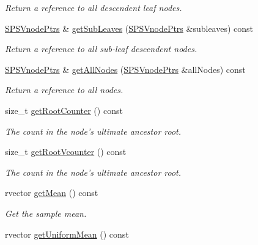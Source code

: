 \begin{DoxyCompactItemize}
\begin{DoxyCompactList}\small\item\em \-Return a reference to all descendent leaf nodes. \end{DoxyCompactList}\item 
\hyperlink{namespacesubpavings_a90b5f0e33fa46403066cc5a89929e6a9}{\-S\-P\-S\-Vnode\-Ptrs} \& \hyperlink{classsubpavings_1_1SPSVnode_aa5408d2d74de8b95325c5973cf43f7fb}{get\-Sub\-Leaves} (\hyperlink{namespacesubpavings_a90b5f0e33fa46403066cc5a89929e6a9}{\-S\-P\-S\-Vnode\-Ptrs} \&subleaves) const 
\begin{DoxyCompactList}\small\item\em \-Return a reference to all sub-\/leaf descendent nodes. \end{DoxyCompactList}\item 
\hyperlink{namespacesubpavings_a90b5f0e33fa46403066cc5a89929e6a9}{\-S\-P\-S\-Vnode\-Ptrs} \& \hyperlink{classsubpavings_1_1SPSVnode_ac637655f207bc9bc049145a2bd904fdf}{get\-All\-Nodes} (\hyperlink{namespacesubpavings_a90b5f0e33fa46403066cc5a89929e6a9}{\-S\-P\-S\-Vnode\-Ptrs} \&all\-Nodes) const 
\begin{DoxyCompactList}\small\item\em \-Return a reference to all nodes. \end{DoxyCompactList}\item 
size\-\_\-t \hyperlink{classsubpavings_1_1SPSVnode_a346a5ff0d8177212b23342cada4b5c18}{get\-Root\-Counter} () const 
\begin{DoxyCompactList}\small\item\em \-The count in the node's ultimate ancestor root. \end{DoxyCompactList}\item 
size\-\_\-t \hyperlink{classsubpavings_1_1SPSVnode_acb4a623e5679b79f05244e79a078e6c1}{get\-Root\-Vcounter} () const 
\begin{DoxyCompactList}\small\item\em \-The count in the node's ultimate ancestor root. \end{DoxyCompactList}\item 
rvector \hyperlink{classsubpavings_1_1SPSVnode_a2d2b97cb6916b19ad2affc4907265b6f}{get\-Mean} () const 
\begin{DoxyCompactList}\small\item\em \-Get the sample mean. \end{DoxyCompactList}\item 
rvector \hyperlink{classsubpavings_1_1SPSVnode_ae2cfb09a96d3c6b0d716236cbfccebd3}{get\-Uniform\-Mean} () const 

\end{DoxyCompactItemize}
